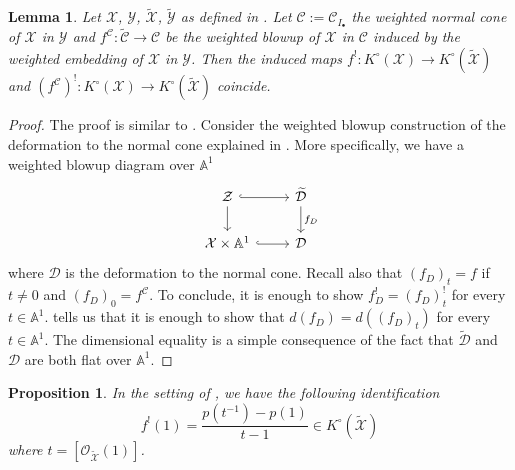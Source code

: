 \documentclass[12pt]{amsart}
\newcommand\A{\mathbb{A}}
\newcommand{\bA}{\mathbb{A}}
\newcommand{\sO}{\mathscr{O}}
\newcommand{\cC}{\mathcal{C}}
\newcommand{\cD}{\mathcal{D}}
\newcommand{\cX}{\mathcal{X}}
\newcommand{\cY}{\mathcal{Y}}
\newcommand{\cZ}{\mathcal{Z}}
\newcommand{\Kring}{K^{\circ}}
\newtheorem{Lemma}[theorem]{Lemma}
\newtheorem{Prop}[theorem]{Proposition}
\theoremstyle{definition}
\begin{document}
\begin{Lemma} \label{lemma: upper shriek of normal bundle}
     Let $\cX$, $\cY$, $\widetilde{\cX}$, $\widetilde{\cY}$ as defined in . Let $\cC:=\cC_{I_\bullet}$ the weighted normal cone  of $\cX$ in $\cY$ and $f^\cC: \widetilde{\cC} \to \cC$ be the weighted blowup of $\cX$ in $\cC$ induced by the weighted embedding of $\cX$ in $\cY$. Then the induced maps $f^!: \Kring(\cX) \to \Kring(\widetilde{\cX})$ and $(f^\cC)^!: \Kring(\cX) \to  \Kring(\widetilde{\cX})$ coincide.
\end{Lemma}

\begin{proof}
    The proof is similar to \cite[Theorem 5.2]{Arena-Obinna}. Consider the weighted blowup construction of the deformation to the normal cone explained in . More specifically, we have a weighted blowup diagram over $\A^1$
    $$
    \begin{tikzcd}
    \cZ \arrow[d] \arrow[r, hook]   & \widetilde{\cD} \arrow[d, "f_D"] \\
    \cX \times \A^1 \arrow[r, hook] & \cD               \end{tikzcd}
    $$
    where $\cD$ is the deformation to the normal cone. Recall also that $(f_D)_t=f$ if $t\neq 0$ and $(f_D)_0=f^{\cC}$. To conclude, it is enough to show $f_D^!=(f_D)_t^!$ for every $t \in \A^1$.  tells us that it is enough to show that $d(f_D)=d\left((f_D)_t\right)$ for every $t\in \A^1$. The dimensional equality is a simple consequence of the fact that $\widetilde{\cD}$ and $\cD$ are both flat over $\bA^1$.    
\end{proof}

\begin{Prop}\label{prop: f upper shriek}
     In the setting of , we have the following identification
     $$ f^{!}(1) = \frac{ p(t^{-1}) - p(1)}{ t-1} \in \Kring(\widetilde{\cX})$$
     where $t=[\sO_{\widetilde{\cX}}(1)]$.
\end{Prop}
\end{document}
